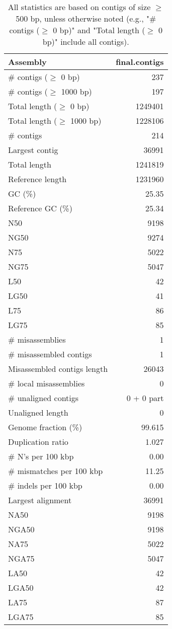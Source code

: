 \documentclass[12pt,a4paper]{article}
\begin{document}
\begin{table}[ht]
\begin{center}
\caption{All statistics are based on contigs of size $\geq$ 500 bp, unless otherwise noted (e.g., "\# contigs ($\geq$ 0 bp)" and "Total length ($\geq$ 0 bp)" include all contigs).}
\begin{tabular}{|l*{1}{|r}|}
\hline
Assembly & final.contigs \\ \hline
\# contigs ($\geq$ 0 bp) & 237 \\ \hline
\# contigs ($\geq$ 1000 bp) & 197 \\ \hline
Total length ($\geq$ 0 bp) & 1249401 \\ \hline
Total length ($\geq$ 1000 bp) & 1228106 \\ \hline
\# contigs & 214 \\ \hline
Largest contig & 36991 \\ \hline
Total length & 1241819 \\ \hline
Reference length & 1231960 \\ \hline
GC (\%) & 25.35 \\ \hline
Reference GC (\%) & 25.34 \\ \hline
N50 & 9198 \\ \hline
NG50 & 9274 \\ \hline
N75 & 5022 \\ \hline
NG75 & 5047 \\ \hline
L50 & 42 \\ \hline
LG50 & 41 \\ \hline
L75 & 86 \\ \hline
LG75 & 85 \\ \hline
\# misassemblies & 1 \\ \hline
\# misassembled contigs & 1 \\ \hline
Misassembled contigs length & 26043 \\ \hline
\# local misassemblies & 0 \\ \hline
\# unaligned contigs & 0 + 0 part \\ \hline
Unaligned length & 0 \\ \hline
Genome fraction (\%) & 99.615 \\ \hline
Duplication ratio & 1.027 \\ \hline
\# N's per 100 kbp & 0.00 \\ \hline
\# mismatches per 100 kbp & 11.25 \\ \hline
\# indels per 100 kbp & 0.00 \\ \hline
Largest alignment & 36991 \\ \hline
NA50 & 9198 \\ \hline
NGA50 & 9198 \\ \hline
NA75 & 5022 \\ \hline
NGA75 & 5047 \\ \hline
LA50 & 42 \\ \hline
LGA50 & 42 \\ \hline
LA75 & 87 \\ \hline
LGA75 & 85 \\ \hline
\end{tabular}
\end{center}
\end{table}
\end{document}
